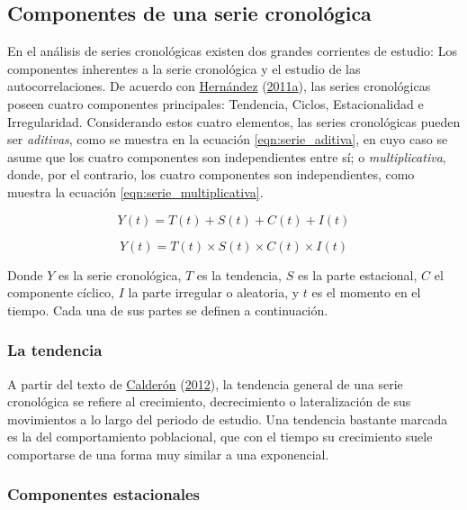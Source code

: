 \documentclass[
]{article}
\begin{document}
\subsection{Componentes de una serie cronológica}

En el análisis de series cronológicas existen dos grandes corrientes de
estudio: Los componentes inherentes a la serie cronológica y el estudio
de las autocorrelaciones. De acuerdo con
\protect\hyperlink{ref-oscarh-1}{Hernández}
(\protect\hyperlink{ref-oscarh-1}{2011a}), las series cronológicas
poseen cuatro componentes principales: Tendencia, Ciclos, Estacionalidad
e Irregularidad. Considerando estos cuatro elementos, las series
cronológicas pueden ser \emph{aditivas}, como se muestra en la ecuación
\ref{eqn:serie_aditiva}, en cuyo caso se asume que los cuatro
componentes son independientes entre sí; o \emph{multiplicativa}, donde,
por el contrario, los cuatro componentes son independientes, como
muestra la ecuación \ref{eqn:serie_multiplicativa}.

\begin{equation}
\label{eqn:serie_aditiva}
Y(t)=T(t)+S(t)+C(t)+I(t)
\end{equation}

\begin{equation}
\label{eqn:serie_multiplicativa}
Y(t)=T(t)\times S(t)\times C(t)\times I(t)
\end{equation}

Donde \(Y\) es la serie cronológica, \(T\) es la tendencia, \(S\) es la
parte estacional, \(C\) el componente cíclico, \(I\) la parte irregular
o aleatoria, y \(t\) es el momento en el tiempo. Cada una de sus partes
se definen a continuación.

\subsubsection{La tendencia}

A partir del texto de
\protect\hyperlink{ref-calderon2012estadistica}{Calderón}
(\protect\hyperlink{ref-calderon2012estadistica}{2012}), la tendencia
general de una serie cronológica se refiere al crecimiento,
decrecimiento o lateralización de sus movimientos a lo largo del periodo
de estudio. Una tendencia bastante marcada es la del comportamiento
poblacional, que con el tiempo su crecimiento suele comportarse de una
forma muy similar a una exponencial.

\subsubsection{Componentes estacionales}
\end{document}
